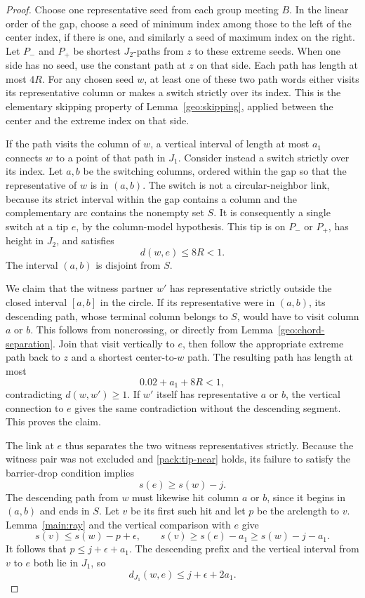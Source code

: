 \begin{proof}
Choose one representative seed from each group meeting $B$.
In the linear order of the gap, choose a seed of minimum index
among those to the left of the center index, if there is one,
and similarly a seed of maximum index on the right.  Let
$P_-$ and $P_+$ be shortest $J_2$-paths from $z$ to these extreme
seeds.  When one side has no seed, use the constant path at $z$
on that side.  Each path has length at most $4R$.
For any chosen seed $w$, at least one of these two path words
either visits its representative column or makes a switch
strictly over its index.  This is the elementary skipping
property of Lemma~\ref{geo:skipping}, applied between the
center and the extreme index on that side.

If the path visits the column of $w$, a vertical interval of
length at most $a_1$ connects $w$ to a point of that path in
$J_1$.  Consider instead a switch strictly over its index.
Let $a,b$ be the switching columns, ordered within the gap so
that the representative of $w$ is in $(a,b)$.  The switch is
not a circular-neighbor link, because its strict interval
within the gap contains a column and the complementary arc
contains the nonempty set $S$.  It is consequently a single
switch at a tip $e$, by the column-model hypothesis.  This tip
is on $P_-$ or $P_+$, has height in $J_2$, and satisfies
\begin{equation}
 d(w,e)\le8R<1.
 \label{pack:tip-near}
\end{equation}
The interval $(a,b)$ is disjoint from $S$.

We claim that the witness partner $w'$ has representative
strictly outside the closed interval $[a,b]$ in the circle.
If its representative were in $(a,b)$, its descending path,
whose terminal column belongs to $S$, would have to visit
column $a$ or $b$.  This follows from noncrossing, or directly
from Lemma~\ref{geo:chord-separation}.  Join that visit
vertically to $e$, then follow the appropriate extreme path
back to $z$ and a shortest center-to-$w$ path.  The resulting
path has length at most
\[
 0.02+a_1+8R<1,
\]
contradicting $d(w,w')\ge1$.  If $w'$ itself has representative
$a$ or $b$, the vertical connection to $e$ gives the same
contradiction without the descending segment.  This proves
the claim.

The link at $e$ thus separates the two witness representatives
strictly.  Because the witness pair was not excluded and
\eqref{pack:tip-near} holds, its failure to satisfy the
barrier-drop condition implies
\begin{equation}
 s(e)\ge s(w)-j.
 \label{pack:tip-not-low}
\end{equation}
The descending path from $w$ must likewise hit column $a$ or
$b$, since it begins in $(a,b)$ and ends in $S$.  Let $v$ be
its first such hit and let $p$ be the arclength to $v$.
Lemma~\ref{main:ray} and the vertical comparison with $e$ give
\[
 s(v)\le s(w)-p+\epsilon,
 \qquad
 s(v)\ge s(e)-a_1\ge s(w)-j-a_1.
\]
It follows that $p\le j+\epsilon+a_1$.  The descending prefix
and the vertical interval from $v$ to $e$ both lie in $J_1$,
so
\begin{equation}
 d_{J_1}(w,e)\le j+\epsilon+2a_1.
 \label{pack:near-path}
\end{equation}


\end{proof}

